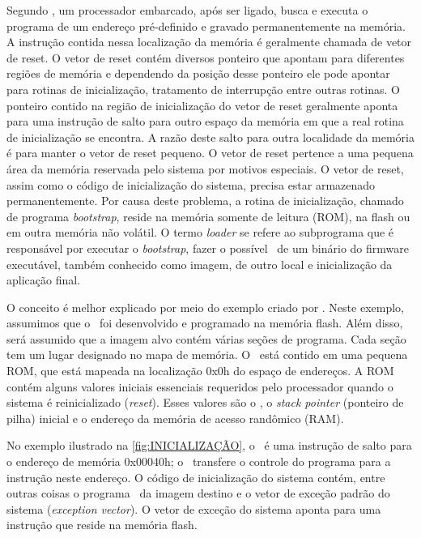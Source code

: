 Segundo , um processador embarcado, após ser ligado, busca e executa o programa de um endereço pré-definido e gravado permanentemente na memória. A instrução contida nessa localização da memória é geralmente chamada de vetor de reset. O vetor de reset contém diversos ponteiro que apontam para diferentes regiões de memória e dependendo da posição desse ponteiro ele pode apontar para rotinas de inicialização, tratamento de interrupção entre outras rotinas.
O ponteiro contido na região de inicialização do vetor de reset geralmente aponta para uma instrução de salto para outro espaço da memória em que a real rotina de inicialização se encontra. A razão deste salto para outra localidade da memória é para manter o vetor de reset pequeno. O vetor de reset pertence a uma pequena área da memória reservada pelo sistema por motivos especiais. O vetor de reset, assim como o código de inicialização do sistema, precisa estar armazenado permanentemente. Por causa deste problema, a rotina de inicialização, chamado de programa \textit{bootstrap}, reside na memória somente de leitura (ROM), na flash ou em outra memória não volátil. O termo \textit{loader} se refere ao subprograma que é responsável por executar o \textit{bootstrap}, fazer o possível \download\ de um binário do firmware executável, também conhecido como imagem, de outro local e inicialização da aplicação final.

O conceito é melhor explicado por meio do exemplo criado por . Neste exemplo, assumimos que o \loader\ foi desenvolvido e programado na memória flash. Além disso, será assumido que a imagem alvo contém várias seções de programa. Cada seção tem um lugar designado no mapa de memória. O \resetv\ está contido em uma pequena ROM, que está mapeada na localização 0x0h do espaço de endereços. A ROM contém alguns valores iniciais essenciais requeridos pelo processador quando o sistema é reinicializado (\textit{reset}). Esses valores são o \resetv, o \textit{stack pointer} (ponteiro de pilha) inicial e o endereço da memória de acesso randômico (RAM). 

No exemplo ilustrado na \autoref{fig:INICIALIZAÇÃO}, o \resetv\ é uma instrução de salto para o endereço de memória 0x00040h; o \resetv\ transfere o controle do programa para a instrução neste endereço. O código de inicialização do sistema contém, entre outras coisas o programa \loader\ da imagem destino e o vetor de exceção padrão do sistema (\textit{exception vector}). O vetor de exceção do sistema aponta para uma instrução que reside na memória flash.

